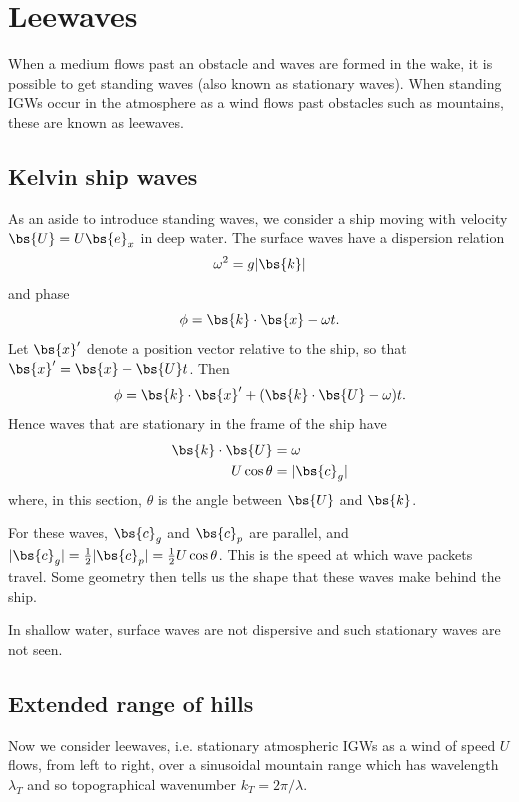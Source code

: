 \section{Leewaves}

When a medium flows past an obstacle and waves are formed in the wake, it is possible to get standing waves (also known as stationary waves). When standing IGWs occur in the atmosphere as a wind flows past obstacles such as mountains, these are known as leewaves.

\subsection{Kelvin ship waves}

As an aside to introduce standing waves, we consider a ship moving with velocity $\bs{U} = U\bs{e}_x$ in deep water. The surface waves have a dispersion relation
\begin{equation}
\omega^2 = g|\bs{k}|
\end{equation}
and phase
\begin{equation}
	\phi = \bs{k}\cdot\bs{x} - \omega t.
\end{equation}
Let $\bs{x}'$ denote a position vector relative to the ship, so that $\bs{x}' = \bs{x} - \bs{U}t$. Then
\begin{equation}
	\phi = \bs{k}\cdot\bs{x}' + (\bs{k}\cdot\bs{U} - \omega) t.
\end{equation}
Hence waves that are stationary in the frame of the ship have
\begin{align}
	\bs{k}\cdot\bs{U} &= \omega \\
	U\cos\theta &= |\bs{c}_g|
\end{align}
where, in this section, $\theta$ is the angle between $\bs{U}$ and $\bs{k}$. 

For these waves, $\bs{c}_g$ and $\bs{c}_p$ are parallel, and $|\bs{c}_g| = \frac{1}{2} |\bs{c}_p| = \frac{1}{2}U\cos\theta$. This is the speed at which wave packets travel. Some geometry then tells us the shape that these waves make behind the ship.

In shallow water, surface waves are not dispersive and such stationary waves are not seen.

\subsection{Extended range of hills}

Now we consider leewaves, i.e. stationary atmospheric IGWs as a wind of speed $U$ flows, from left to right, over a sinusoidal mountain range which has wavelength $\lambda_T$ and so topographical wavenumber $k_T = 2\pi/\lambda$. 

